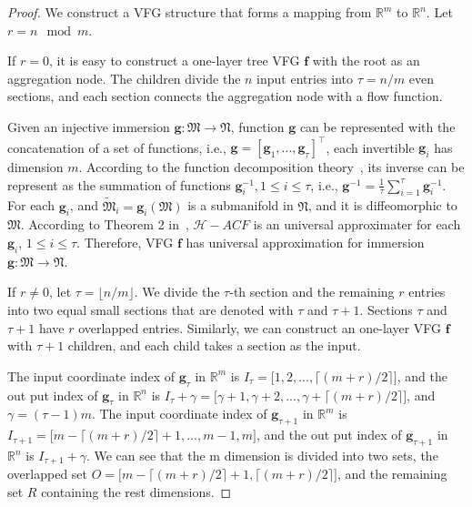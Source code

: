 \documentclass[sigconf, anonymous, review]{acmart}
\theoremstyle{plain}
\theoremstyle{definition}
\theoremstyle{remark}
\begin{document}
\begin{proof}
We  construct a VFG structure that forms a mapping from $\mathbb{R}^m$ to $\mathbb{R}^n$.  Let $r=n\mod m$. 

If  $r =0$, it is easy to construct a one-layer tree VFG  $\mathbf{f}$ with  the root as an aggregation node. The children divide the $n$ input entries into $\tau = n/m$ even sections, and each section  connects the aggregation node with a flow function. 


Given an injective immersion $\mathbf{g}:\mathfrak{M}  \rightarrow \mathfrak{N}$, function $\mathbf{g}$ can be represented with the concatenation of a set of functions, i.e.,  $\mathbf{g}=[\mathbf{g}_1, ...,  \mathbf{g}_{\tau}]^{\top}$, each invertible $\mathbf{g}_i$ has dimension $m$. According to the function decomposition theory~\cite{kuo2010decompositions}, its inverse  can be represent as the summation of  functions $\mathbf{g}^{-1}_{i}, 1\leq i \leq \tau$, i.e., $\mathbf{g}^{-1} = \frac{1}{\tau} \sum_{i=1}^{\tau} \mathbf{g}^{-1}_{i}$. For each $\mathbf{g}_{i}$, and $\tilde{\mathfrak{M}}_{i} = \mathbf{g}_{i}(\mathfrak{M})$ is a submanifold in $\mathfrak{N}$, and it is diffeomorphic to $\mathfrak{M}$. According to  Theorem 2 in~\cite{Takeshi2020}, $\mathcal{H}-ACF$ is  an  universal approximater  for each $\mathbf{g}_{i}$, $1\leq i \leq \tau$. Therefore,  VFG $\mathbf{f}$ has  universal approximation for immersion $\mathbf{g}:\mathfrak{M}  \rightarrow \mathfrak{N}$. 



If $r \neq 0$, let $\tau = \lfloor n/m \rfloor$. We  divide the  $\tau$-th section and the remaining $r$ entries into two equal small sections that are denoted with $\tau$ and $\tau +1$. Sections $\tau$ and $\tau +1$ have  $r$  overlapped entries. Similarly, we can construct an one-layer VFG $\mathbf{f}$ with $\tau +1$ children,  and  each child takes a section as the input.

The input coordinate index of $\mathbf{g}_{\tau}$ in $\mathbb{R}^m$ is $I_{\tau} = \big[1,2,..., \lceil (m+r)/2 \rceil \big]$, and the out put index of $\mathbf{g}_{\tau}$  in $\mathbb{R}^n$  is $I_{\tau} + \gamma = \big[\gamma + 1, \gamma + 2,...,  \gamma + \lceil (m+r)/2 \rceil \big]$, and $\gamma = (\tau-1)m$. The input coordinate index of $\mathbf{g}_{\tau+1}$ in $\mathbb{R}^m$ is $I_{\tau + 1} = \big[m- \lceil (m+r)/2 \rceil + 1, ..., m-1, m \big]$, and the out put index of $\mathbf{g}_{\tau +1}$  in $\mathbb{R}^n$  is $I_{\tau+1} + \gamma $.   We can see that the m dimension is divided into two sets, the overlapped set $O = \big[ m- \lceil (m+r)/2 \rceil + 1, \lceil (m+r)/2 \rceil  \big]$, and the remaining set $R$ containing the rest dimensions. 


\end{proof}
\end{document}
